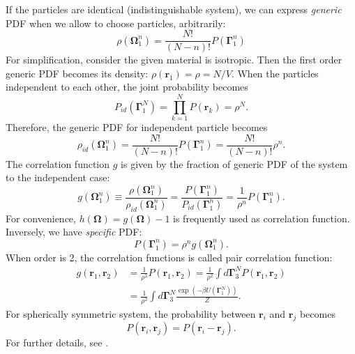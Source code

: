 \documentclass[10pt, a4paper]{report}
\begin{document}
\begin{appendices}
  If the particles are identical (indistinguishable system), we can express \textit{generic} PDF when we allow to choose particles, arbitrarily:
  \begin{equation}
    \rho(\boldsymbol{\Omega}_{1}^{n}) = \frac{N!}{(N-n)!}P(\boldsymbol{\Gamma}_{1}^{n})\label{eq:generic_PDF}
  \end{equation}
  For simplification, consider the given material is isotropic. Then the first order generic PDF becomes its density: $\rho(\mathbf{r}_1) = \rho = N/V$. When the particles independent to each other, the joint probability becomes 
  \begin{equation}
    P_{id}(\boldsymbol{\Gamma}_{1}^{N}) = \prod_{k=1}^{N}P(\mathbf{r}_k) = \rho^{N}.\label{eq:independent_PDF}
  \end{equation}
  Therefore, the generic PDF for independent particle becomes
  \begin{equation}
    \rho_{id}(\boldsymbol{\Omega}_{1}^{n}) = \frac{N!}{(N-n)!}P(\boldsymbol{\Gamma}_{1}^{n}) = \frac{N!}{(N-n)!}\rho^n.
  \end{equation}
  The correlation function $g$ is given by the fraction of generic PDF of the system to the independent case:
  \begin{equation}
    g(\boldsymbol{\Omega}_{1}^{n}) \equiv \frac{\rho(\boldsymbol{\Omega}_{1}^{n})}{\rho_{id}(\boldsymbol{\Omega}_{1}^{n})} = \frac{P(\boldsymbol{\Gamma}_{1}^{n})}{P_{id}(\boldsymbol{\Gamma}_{1}^{n})}=\frac{1}{\rho^n}P(\boldsymbol{\Gamma}_{1}^{n}).
  \end{equation}
  For convenience, $h(\boldsymbol{\Omega}) = g(\boldsymbol{\Omega}) - 1$ is frequently used as correlation function.
  Inversely, we have \textit{specific} PDF:
  \begin{equation}
    P(\boldsymbol{\Gamma}_{1}^{n}) = \rho^n g(\boldsymbol{\Omega}_{1}^{n}).
  \end{equation}
  When order is 2, the correlation functions is called pair correlation function:
  \begin{align}
    g(\mathbf{r}_1, \mathbf{r}_2) &= \frac{1}{\rho^2}P(\mathbf{r}_1, \mathbf{r}_2) = \frac{1}{\rho^2}\int d\boldsymbol{\Gamma}_{3}^{N}P(\mathbf{r}_1, \mathbf{r}_2) \\
    &= \frac{1}{\rho^2}\int d\boldsymbol{\Gamma}_{3}^{N} \frac{\exp(-\beta U(\boldsymbol{\Gamma}_{1}^{N}))}{Z}.
  \end{align}
  For spherically symmetric system, the probability between $\mathbf{r}_i$ and $\mathbf{r}_j$ becomes
  \begin{equation}
    P(\mathbf{r}_i, \mathbf{r}_j) = P(\mathbf{r}_i - \mathbf{r}_j).
  \end{equation}
  For further details, see \textcite{chandler1987}.



\end{appendices}
\end{document}

